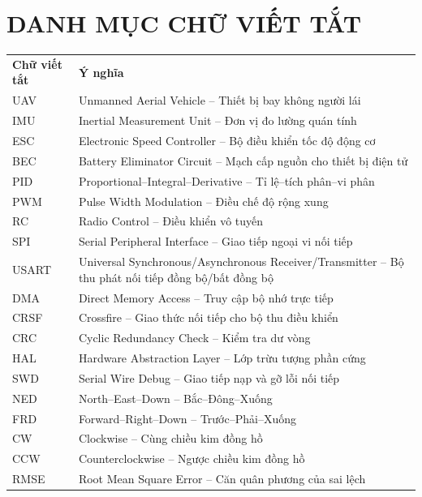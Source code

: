 \chapter*{DANH MỤC CHỮ VIẾT TẮT}

\begingroup
\small
\begin{tabular}{@{}L{4cm}L{9cm}@{}}
    \textbf{Chữ viết tắt} & \textbf{Ý nghĩa} \\
    UAV & Unmanned Aerial Vehicle -- Thiết bị bay không người lái \\
    IMU & Inertial Measurement Unit -- Đơn vị đo lường quán tính \\
    ESC & Electronic Speed Controller -- Bộ điều khiển tốc độ động cơ \\
    BEC & Battery Eliminator Circuit -- Mạch cấp nguồn cho thiết bị điện tử \\
    PID & Proportional--Integral--Derivative -- Tỉ lệ--tích phân--vi phân \\
    PWM & Pulse Width Modulation -- Điều chế độ rộng xung \\
    RC & Radio Control -- Điều khiển vô tuyến \\
    SPI & Serial Peripheral Interface -- Giao tiếp ngoại vi nối tiếp \\
    USART & Universal Synchronous/Asynchronous Receiver/Transmitter -- Bộ thu phát nối tiếp đồng bộ/bất đồng bộ \\
    DMA & Direct Memory Access -- Truy cập bộ nhớ trực tiếp \\
    CRSF & Crossfire -- Giao thức nối tiếp cho bộ thu điều khiển \\
    CRC & Cyclic Redundancy Check -- Kiểm tra dư vòng \\
    HAL & Hardware Abstraction Layer -- Lớp trừu tượng phần cứng \\
    SWD & Serial Wire Debug -- Giao tiếp nạp và gỡ lỗi nối tiếp \\
    NED & North--East--Down -- Bắc--Đông--Xuống \\
    FRD & Forward--Right--Down -- Trước--Phải--Xuống \\
    CW & Clockwise -- Cùng chiều kim đồng hồ \\
    CCW & Counterclockwise -- Ngược chiều kim đồng hồ \\
    RMSE & Root Mean Square Error -- Căn quân phương của sai lệch \\
\end{tabular}
\endgroup
